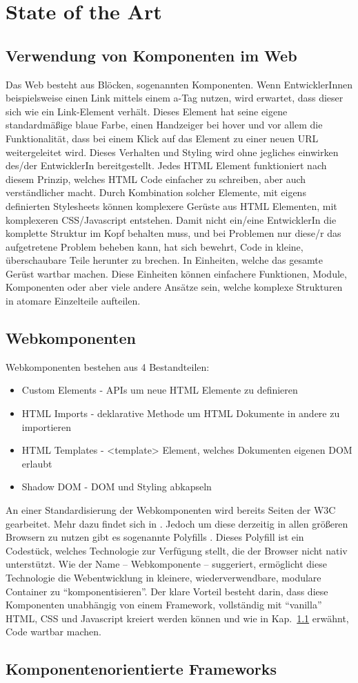 \chapter{State of the Art}

\section{Verwendung von Komponenten im Web}
\label{cha:component_usage}
Das Web besteht aus Blöcken, sogenannten Komponenten. Wenn EntwicklerInnen beispielsweise einen Link mittels einem a-Tag nutzen, wird erwartet, dass dieser sich wie ein Link-Element verhält. Dieses Element hat seine eigene standardmäßige blaue Farbe, einen Handzeiger bei hover und vor allem die Funktionalität, dass bei einem Klick auf das Element zu einer neuen URL weitergeleitet wird. Dieses Verhalten und Styling wird ohne jegliches einwirken des/der EntwicklerIn bereitgestellt. Jedes HTML Element funktioniert nach diesem Prinzip, welches HTML Code einfacher zu schreiben, aber auch verständlicher macht.
Durch Kombination solcher Elemente, mit eigens definierten Stylesheets können komplexere Gerüste aus HTML Elementen, mit komplexeren CSS/Javascript entstehen.
Damit nicht ein/eine EntwicklerIn die komplette Struktur im Kopf behalten muss, und bei Problemen nur diese/r das aufgetretene Problem beheben kann, hat sich bewehrt, Code in kleine, überschaubare Teile herunter zu brechen. In Einheiten, welche das gesamte Gerüst wartbar machen. Diese Einheiten können einfachere Funktionen, Module, Komponenten oder aber viele andere Ansätze sein, welche komplexe Strukturen in atomare Einzelteile aufteilen. 


\section{Webkomponenten}
Webkomponenten bestehen aus 4 Bestandteilen: 
\begin{itemize}  
	\item Custom Elements - APIs um neue HTML Elemente zu definieren
	\item HTML Imports - deklarative Methode um HTML Dokumente in andere zu importieren
	\item HTML Templates - <template> Element, welches Dokumenten eigenen DOM erlaubt
	\item Shadow DOM - DOM und Styling abkapseln
\end{itemize}
An einer Standardisierung der Webkomponenten wird bereits Seiten der W3C gearbeitet. Mehr dazu findet sich in \cite{w3c-components}. Jedoch um diese derzeitig in allen größeren Browsern zu nutzen gibt es sogenannte Polyfills \cite{polyfill}. Dieses Polyfill ist ein Codestück, welches Technologie zur Verfügung stellt, die der Browser nicht nativ unterstützt. 
Wie der Name -- Webkomponente -- suggeriert, ermöglicht diese Technologie die Webentwicklung in kleinere, wiederverwendbare, modulare Container zu "`komponentisieren"'.  Der klare Vorteil besteht darin, dass diese Komponenten unabhängig von einem Framework, vollständig mit "`vanilla"' HTML, CSS und Javascript kreiert werden können und wie in Kap.~\ref{cha:component_usage} erwähnt, Code wartbar machen.

\section{Komponentenorientierte Frameworks}